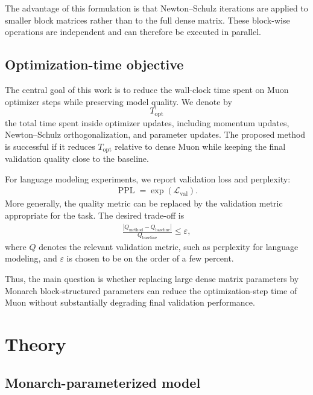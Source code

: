 \documentclass{article}
\begin{document}
The advantage of this formulation is that Newton--Schulz iterations are applied to smaller block matrices rather than to the full dense matrix. These block-wise operations are independent and can therefore be executed in parallel.

\subsection{Optimization-time objective}

The central goal of this work is to reduce the wall-clock time spent on Muon optimizer steps while preserving model quality. We denote by
\[
T_{\mathrm{opt}}
\]
the total time spent inside optimizer updates, including momentum updates, Newton--Schulz orthogonalization, and parameter updates. The proposed method is successful if it reduces \(T_{\mathrm{opt}}\) relative to dense Muon while keeping the final validation quality close to the baseline.

For language modeling experiments, we report validation loss and perplexity:
\begin{align}
\operatorname{PPL} = \exp(\mathcal{L}_{\mathrm{val}}).
\end{align}
More generally, the quality metric can be replaced by the validation metric appropriate for the task. The desired trade-off is
\begin{align}
\frac{
\left|
Q_{\mathrm{method}} - Q_{\mathrm{baseline}}
\right|
}{
Q_{\mathrm{baseline}}
}
\leq \varepsilon,
\end{align}
where \(Q\) denotes the relevant validation metric, such as perplexity for language modeling, and \(\varepsilon\) is chosen to be on the order of a few percent.

Thus, the main question is whether replacing large dense matrix parameters by Monarch block-structured parameters can reduce the optimization-step time of Muon without substantially degrading final validation performance.

\section{Theory}\label{sec:theory}

\subsection{Monarch-parameterized model}
\end{document}
